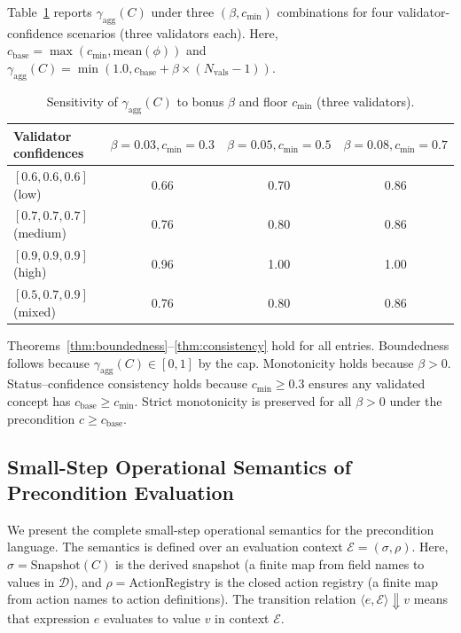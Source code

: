 Table~\ref{tab:sensitivity} reports $\gamma_{\text{agg}}(C)$ under three $(\beta, c_{\min})$ combinations for four validator-confidence scenarios (three validators each). Here, $c_{\text{base}} = \max(c_{\min}, \text{mean}(\phi))$ and $\gamma_{\text{agg}}(C) = \min(1.0, c_{\text{base}} + \beta \times (N_{\text{vals}} - 1))$.

\begin{table}[htbp]
\centering
\caption{Sensitivity of $\gamma_{\text{agg}}(C)$ to bonus $\beta$ and floor $c_{\min}$ (three validators).}
\label{tab:sensitivity}
\begin{tabular}{@{}lccc@{}}
\toprule
\textbf{Validator confidences} & $\beta=0.03, c_{\min}=0.3$ & $\beta=0.05, c_{\min}=0.5$ & $\beta=0.08, c_{\min}=0.7$ \\
\midrule
$[0.6, 0.6, 0.6]$ (low)    & 0.66 & 0.70 & 0.86 \\
$[0.7, 0.7, 0.7]$ (medium)  & 0.76 & 0.80 & 0.86 \\
$[0.9, 0.9, 0.9]$ (high)    & 0.96 & 1.00 & 1.00 \\
$[0.5, 0.7, 0.9]$ (mixed)   & 0.76 & 0.80 & 0.86 \\
\bottomrule
\end{tabular}
\end{table}

Theorems~\ref{thm:boundedness}--\ref{thm:consistency} hold for all entries. Boundedness follows because $\gamma_{\text{agg}}(C) \in [0,1]$ by the cap. Monotonicity holds because $\beta > 0$. Status--confidence consistency holds because $c_{\min} \geq 0.3$ ensures any validated concept has $c_{\text{base}} \geq c_{\min}$. Strict monotonicity is preserved for all $\beta > 0$ under the precondition $c \geq c_{\text{base}}$.

\subsection{Small-Step Operational Semantics of Precondition Evaluation}

We present the complete small-step operational semantics for the precondition language. The semantics is defined over an evaluation context $\mathcal{E} = (\sigma, \rho)$. Here, $\sigma = \text{Snapshot}(C)$ is the derived snapshot (a finite map from field names to values in $\mathcal{D}$), and $\rho = \text{ActionRegistry}$ is the closed action registry (a finite map from action names to action definitions). The transition relation $\langle e, \mathcal{E} \rangle \Downarrow v$ means that expression $e$ evaluates to value $v$ in context $\mathcal{E}$.

